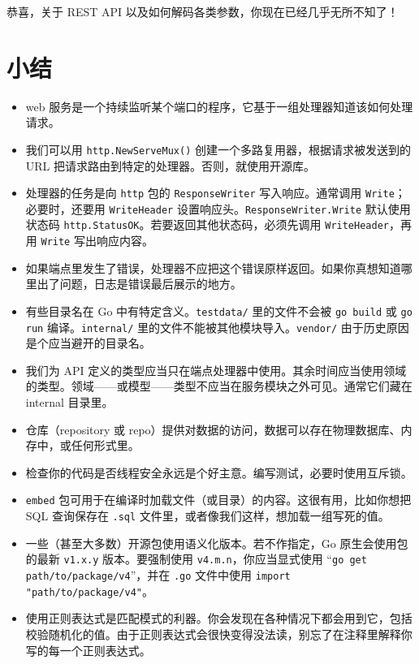恭喜，关于 REST API 以及如何解码各类参数，你现在已经几乎无所不知了！

\section*{小结}

\begin{itemize}
\item web 服务是一个持续监听某个端口的程序，它基于一组处理器知道该如何处理请求。
\item 我们可以用 \texttt{http.NewServeMux()} 创建一个多路复用器，根据请求被发送到的 URL 把请求路由到特定的处理器。否则，就使用开源库。

\item 处理器的任务是向 \texttt{http} 包的 \texttt{ResponseWriter} 写入响应。通常调用 \texttt{Write}；必要时，还要用 \texttt{WriteHeader} 设置响应头。\texttt{ResponseWriter.Write} 默认使用状态码 \texttt{http.StatusOK}。若要返回其他状态码，必须先调用 \texttt{WriteHeader}，再用 \texttt{Write} 写出响应内容。
\item 如果端点里发生了错误，处理器不应把这个错误原样返回。如果你真想知道哪里出了问题，日志是错误最后展示的地方。
\item 有些目录名在 Go 中有特定含义。\texttt{testdata/} 里的文件不会被 \texttt{go build} 或 \texttt{go run} 编译。\texttt{internal/} 里的文件不能被其他模块导入。\texttt{vendor/} 由于历史原因是个应当避开的目录名。
\item 我们为 API 定义的类型应当只在端点处理器中使用。其余时间应当使用领域的类型。领域——或模型——类型不应当在服务模块之外可见。通常它们藏在 internal 目录里。
\item 仓库（repository 或 repo）提供对数据的访问，数据可以存在物理数据库、内存中，或任何形式里。
\item 检查你的代码是否线程安全永远是个好主意。编写测试，必要时使用互斥锁。
\item \texttt{embed} 包可用于在编译时加载文件（或目录）的内容。这很有用，比如你想把 SQL 查询保存在 \texttt{.sql} 文件里，或者像我们这样，想加载一组写死的值。
\item 一些（甚至大多数）开源包使用语义化版本。若不作指定，Go 原生会使用包的最新 \texttt{v1.x.y} 版本。要强制使用
\texttt{v4.m.n}，你应当显式使用 ``\texttt{go get path/to/package/v4}''，并在 \texttt{.go} 文件中使用 \texttt{import "path/to/package/v4"}。
\item 使用正则表达式是匹配模式的利器。你会发现在各种情况下都会用到它，包括校验随机化的值。由于正则表达式会很快变得没法读，别忘了在注释里解释你写的每一个正则表达式。

\end{itemize}
